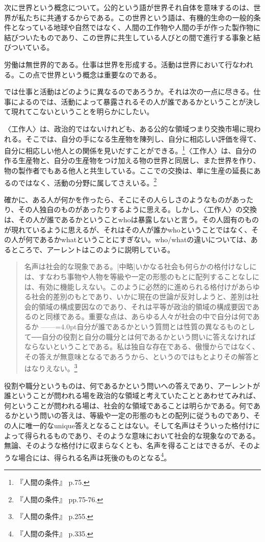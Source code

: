 \documentclass[b5j,twoside,twocolumn]{utarticle}
\begin{document}
次に世界という概念について。公的という語が世界それ自体を意味するのは、世界が私たちに共通するからである。この世界という語は、有機的生命の一般的条件となっている地球や自然ではなく、人間の工作物や人間の手が作った製作物に結びついたものであり、この世界に共生している人びとの間で進行する事象と結びついている。


労働は無世界的である。仕事は世界を形成する。活動は世界において行なわれる。この点で世界という概念は重要なのである。


では仕事と活動はどのように異なるのであろうか。それは次の一点に尽きる。仕事によるのでは、活動によって暴露されるその人が誰であるかということが決して現れてこないということを明らかにしたい。


〈工作人〉は、政治的ではないけれども、ある公的な領域つまり交換市場に現われる。そこでは、自分の手になる生産物を陳列し、自分に相応しい評価を得て、自分に相応しい他人との関係を見いだすことができる。\footnote{『人間の条件』 p.75.}〈工作人〉は、自分の作る生産物と、自分の生産物をつけ加える物の世界と同居し、また世界を作り、物の製作者でもある他人と共生している。ここでの交換は、単に生産の延長にあるのではなく、活動の分野に属してさえいる。\footnote{『人間の条件』 pp.75-76.}


確かに、ある人が何かを作ったら、そこにその人らしさのようなものがあったり、その人独自のものがあったりするように思える。しかし、〈工作人〉の交換は、その人が誰であるかということwhoは暴露しないと言う。その人固有のものが現れているように思えるが、それはその人が誰かwhoということではなく、その人が何であるかwhatということにすぎない。who/whatの違いについては、あるところで、アーレントはこのように説明している。
\begin{quote}
名声は社会的な現象である。[中略]いかなる社会も何らかの格付けなしには、すなわち事物や人物を等級や一定の形態のもとに配列することなしには、有効に機能しえない。このように必然的に進められる格付けがあらゆる社会的差別のもとであり、いかに現在の世論が反対しようと、差別は社会的領域の構成要因なのであり、それは平等が政治的領域の構成要因であるのと同様である。重要な点は、あらゆる人々が社会の中で自分は何であるか\tbaselineshift =2.5pt ------\tbaselineshift =4.0pt自分が誰であるかという質問とは性質の異なるものとして──自分の役割と自分の職分とは何であるかという問いに答えなければならないということである。私は独自な存在である、傲慢からではなく、その答えが無意味となるであろうから、というのではもとよりその解答とはなりえない。\footnote{『人間の条件』 p.255.}
\end{quote}

役割や職分というものは、何であるかという問いへの答えであり、アーレントが誰ということが問われる場を政治的な領域と考えていたこととあわせてみれば、何ということが問われる場は、社会的な領域であることは明らかである。何であるかという問いの答えは、等級や一定の形態のもとの配列に従うものであり、その人に唯一的なunique答えとなることはない。そして名声はそういった格付けによって得られるものであり、そのような意味において社会的な現象なのである。無論、そのような格付けに収まらなくとも、名声を得ることはできるが、そのような場合には、得られる名声は死後のものとなる\footnote{『人間の条件』 p.335.}。
\end{document}
